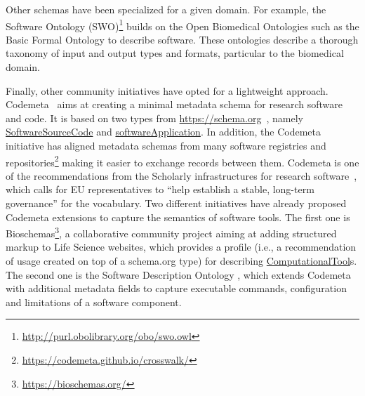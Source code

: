 Other schemas have been specialized for a given domain. For example, the Software Ontology (SWO)\footnote{\url{http://purl.obolibrary.org/obo/swo.owl}} builds on the Open Biomedical Ontologies such as the Basic Formal Ontology \cite{spear2016functions} to describe software. These ontologies describe a thorough taxonomy of input and output types and formats, particular to the biomedical domain.

Finally, other community initiatives have opted for a lightweight approach. Codemeta~\cite{Boettigeral2017} aims at creating a minimal metadata schema for research software and code. It is based on two types from \url{https://schema.org}~\cite{guha_schemaorg_2016}, namely \href{https://schema.org/SoftwareSourceCode}{SoftwareSourceCode} and \href{https://schema.org/SoftwareApplication}{softwareApplication}. In addition, the Codemeta initiative has aligned metadata schemas from many software registries and repositories\footnote{\url{https://codemeta.github.io/crosswalk/}} making it easier to exchange records between them. Codemeta is one of the recommendations from the Scholarly infrastructures for research software~\cite{sirs_2019}, which calls for EU representatives to ``help establish a stable, long-term governance'' for the vocabulary. Two different initiatives have already proposed Codemeta extensions to capture the semantics of software tools. The first one is Bioschemas\footnote{\url{https://bioschemas.org/}}, a collaborative community project aiming at adding structured markup to Life Science websites, which provides a profile (i.e., a recommendation of usage created on top of a schema.org type) for describing \href{https://bioschemas.org/profiles/ComputationalTool}{ComputationalTool}s. The second one is the Software Description Ontology \cite{garijo2019okg}, which extends Codemeta with additional metadata fields to capture executable commands, configuration and limitations of a software component. 




